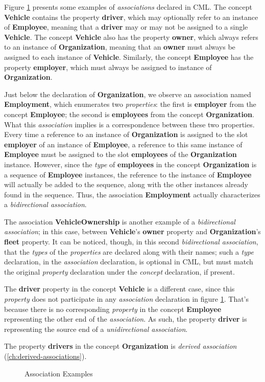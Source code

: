 Figure \ref{fig:ex:associations} presents some examples of \emph{associations} declared in CML.
The concept \textbf{Vehicle} contains the property \textbf{driver},
which may optionally refer to an instance of \textbf{Employee},
meaning that a \textbf{driver} may or may not be assigned to a single \textbf{Vehicle}.
The concept \textbf{Vehicle} also has the property \textbf{owner},
which always refers to an instance of \textbf{Organization},
meaning that an \textbf{owner} must always be assigned to each instance of \textbf{Vehicle}. 
Similarly,
the concept \textbf{Employee} has the property \textbf{employer},
which must always be assigned to instance of \textbf{Organization}.

Just below the declaration of \textbf{Organization},
we observe an association named \textbf{Employment},
which enumerates two \emph{properties}:
the first is \textbf{employer} from the concept \textbf{Employee};
the second is \textbf{employees} from the concept \textbf{Organization}.
What this \emph{association} implies is a correspondence between these two properties.
Every time a reference to an instance of \textbf{Organization} is assigned to
the slot \textbf{employer} of an instance of \textbf{Employee},
a reference to this same instance of \textbf{Employee} must be assigned to
the slot \textbf{employees} of the \textbf{Organization} instance.
However,
since the \emph{type} of \textbf{employees}
in the concept \textbf{Organization}
is a sequence of \textbf{Employee} instances,
the reference to the instance of \textbf{Employee} will actually be added to the sequence,
along with the other instances already found in the sequence.
Thus, the association \textbf{Employment} actually characterizes a \emph{bidirectional association}.

The association \textbf{VehicleOwnership} is another example of a \emph{bidirectional association};
in this case,
between \textbf{Vehicle}'s \textbf{owner} property and \textbf{Organization}'s \textbf{fleet} property.
It can be noticed, though, 
in this second \emph{bidirectional association},
that the \emph{types} of the \emph{properties} are declared along with their names;
such a \emph{type} declaration,
in the \emph{association} declaration,
is optional in CML,
but must match the original \emph{property} declaration under the \emph{concept} declaration,
if present.

The \textbf{driver} property in the concept \textbf{Vehicle} is a different case,
since this \emph{property} does not participate in any \emph{association} declaration
in figure \ref{fig:ex:associations}.
That's because there is no corresponding \emph{property} in the concept \textbf{Employee}
representing the other end of the \emph{association}.
As such, the property \textbf{driver} is representing the source end of a \emph{unidirectional association}.

The property \textbf{drivers} in the concept \textbf{Organization}
is \emph{derived association} (\ref{ch:derived-associations}).

\begin{figure}
\verbatimfont{\small}

\caption{Association Examples}
\label{fig:ex:associations}
\end{figure}

